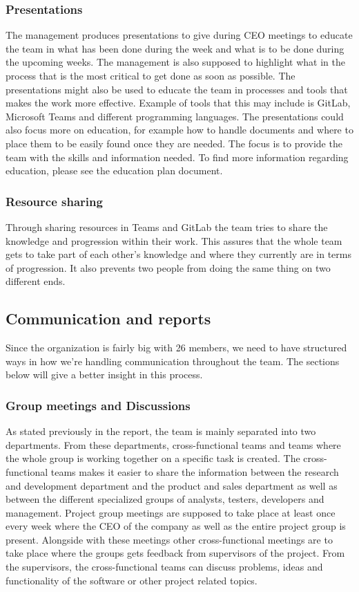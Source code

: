 \subsubsection{Presentations}
The management produces presentations to give during CEO meetings to educate the team in what has been done during the week and what is to be done during the upcoming weeks. The management is also supposed to highlight what in the process that is the most critical to get done as soon as possible. The presentations might also be used to educate the team in processes and tools that makes the work more effective. Example of tools that this may include is GitLab, Microsoft Teams and different programming languages. The presentations could also focus more on education, for example how to handle documents and where to place them to be easily found once they are needed. The focus is to provide the team with the skills and information needed. To find more information regarding education, please see the education plan document. 

\subsubsection{Resource sharing}
Through sharing resources in Teams and GitLab the team tries to share the knowledge and progression within their work. This assures that the whole team gets to take part of each other’s knowledge and where they currently are in terms of progression. It also prevents two people from doing the same thing on two different ends. 

\subsection{Communication and reports}
Since the organization is fairly big with 26 members, we need to have structured ways in how we're handling communication throughout the team. The sections below will give a better insight in this process. 
\subsubsection{Group meetings and Discussions}
As stated previously in the report, the team is mainly separated into two departments. From these departments, cross-functional teams and teams where the whole group is working together on a specific task is created. The cross-functional teams makes it easier to share the information between the research and development department and the product and sales department as well as between the different specialized groups of analysts, testers, developers and management. Project group meetings are supposed to take place at least once every week where the CEO of the company as well as the entire project group is present. Alongside with these meetings other cross-functional meetings are to take place where the groups gets feedback from supervisors of the project. From the supervisors, the cross-functional teams can discuss problems, ideas and functionality of the software or other project related topics. 


